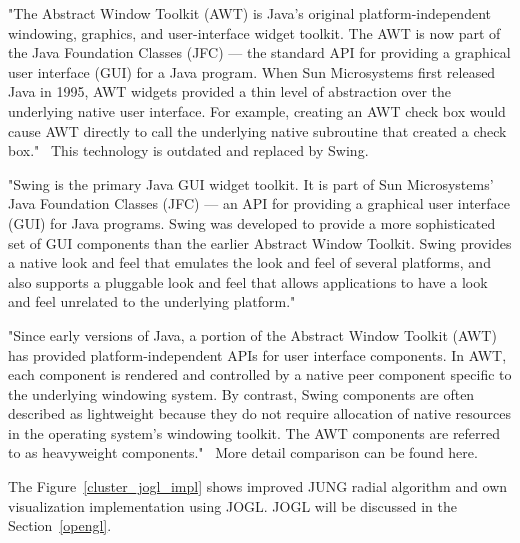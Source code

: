 \documentclass[a4paper,oneside]{article}
\begin{document}
"The Abstract Window Toolkit (AWT) is Java's original platform-independent windowing, graphics, and user-interface widget toolkit. The AWT is now part of the Java Foundation Classes (JFC) — the standard API for providing a graphical user interface (GUI) for a Java program. When Sun Microsystems first released Java in 1995, AWT widgets provided a thin level of abstraction over the underlying native user interface. For example, creating an AWT check box would cause AWT directly to call the underlying native subroutine that created a check box."~\cite{JAVA_AWT} This technology is outdated and replaced by Swing.


"Swing is the primary Java GUI widget toolkit. It is part of Sun Microsystems' Java Foundation Classes (JFC) — an API for providing a graphical user interface (GUI) for Java programs.
Swing was developed to provide a more sophisticated set of GUI components than the earlier Abstract Window Toolkit. Swing provides a native look and feel that emulates the look and feel of several platforms, and also supports a pluggable look and feel that allows applications to have a look and feel unrelated to the underlying platform."~\cite{JAVA_SWING}


"Since early versions of Java, a portion of the Abstract Window Toolkit (AWT) has provided platform-independent APIs for user interface components. In AWT, each component is rendered and controlled by a native peer component specific to the underlying windowing system.
By contrast, Swing components are often described as lightweight because they do not require allocation of native resources in the operating system's windowing toolkit. The AWT components are referred to as heavyweight components."~\cite{JAVA_SWING} More detail comparison can be found here.~\cite{AWT_VS_SWING}


The Figure~\ref{cluster_jogl_impl} shows improved JUNG radial algorithm and own visualization implementation using JOGL. JOGL will be discussed in the Section~\ref{opengl}.
\end{document}
